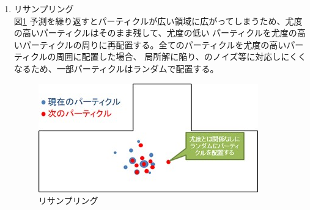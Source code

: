 \begin{enumerate}
    \item リサンプリング\\
    図\ref{auto:navstack:resample}
    予測を繰り返すとパーティクルが広い領域に広がってしまうため、尤度の高いパーティクルはそのまま残して、尤度の低い
    パーティクルを尤度の高いパーティクルの周りに再配置する。全てのパーティクルを尤度の高いパーティクルの周囲に配置した場合、
    局所解に陥り、のノイズ等に対応しにくくなるため、一部パーティクルはランダムで配置する。
    \begin{figure}[h]
      \begin{center}
        \includegraphics[width=.5\linewidth]{img/auto_16.jpg}
        \caption{リサンプリング}
        \label{auto:navstack:resample}
      \end{center}
    \end{figure}
  \end{enumerate}
  \clearpage
